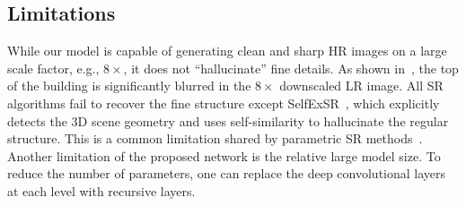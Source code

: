 \documentclass[10pt,twocolumn,letterpaper]{article}
\begin{document}
	\subsection{Limitations}
	While our model is capable of generating clean and sharp HR images on a large scale factor, e.g., $8\times$, it does not ``hallucinate'' fine details.
	As shown in~, the top of the building is significantly blurred in the $8\times$ downscaled LR image.
	All SR algorithms fail to recover the fine structure except SelfExSR~\cite{Huang-CVPR-2015}, 
	which explicitly detects the 3D scene geometry and uses self-similarity to hallucinate the regular structure.
	This is a common limitation shared by parametric SR methods~\cite{SRCNN,FSRCNN,VDSR,DRCN}.
	Another limitation of the proposed network is the relative large model size.
	To reduce the number of parameters, one can replace the deep convolutional layers at each level with recursive layers.
	
\end{document}
